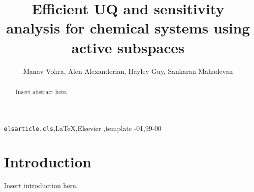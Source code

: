 \documentclass[1pt]{elsarticle}
\begin{document}
\begin{frontmatter}

\title{Efficient UQ and sensitivity analysis for chemical systems using active 
subspaces}

\author{Manav Vohra, Alen Alexanderian, Hayley Guy, Sankaran Mahadevan}
\address{Vanderbilt, NCSU}




\begin{abstract}
Insert abstract here.
\end{abstract}

\begin{keyword}
\texttt{elsarticle.cls}\sep \LaTeX\sep Elsevier \sep template
-01\sep  99-00
\end{keyword}

\end{frontmatter}


\section{Introduction}
Insert introduction here.
\end{document}
